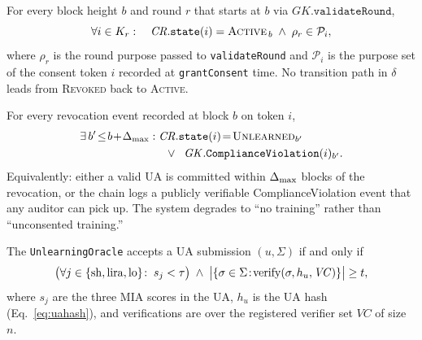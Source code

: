 \begin{property}\label{prop:safety}
For every block height $b$ and round $r$ that starts at $b$ via
$\mathit{GK}.\mathtt{validateRound}$,
\begin{equation}\label{eq:safety}
    \forall i \in K_r:\quad \mathit{CR}.\mathtt{state}(i) =
    \textsc{Active}_{\,b} \;\wedge\;
    \rho_r \in \mathcal{P}_i,
\end{equation}
where $\rho_r$ is the round purpose passed to
\texttt{validateRound} and $\mathcal{P}_i$ is the purpose set of the
consent token $i$ recorded at \texttt{grantConsent} time. No transition
path in $\delta$ leads from \textsc{Revoked} back to \textsc{Active}.
\end{property}

\begin{property}\label{prop:liveness}
For every revocation event recorded at block $b$ on token $i$,
\begin{equation}\label{eq:liveness}
\begin{aligned}
    \exists\, b' \!\le\! b\!+\!\Delta_{\max}:\;
    &\mathit{CR}.\mathtt{state}(i)\!=\!\textsc{Unlearned}_{b'} \\
    &\;\;\vee\;\;
    \mathit{GK}.\mathtt{ComplianceViolation}(i)_{b'}.
\end{aligned}
\end{equation}
Equivalently: either a valid UA is committed within $\Delta_{\max}$ blocks of
the revocation, or the chain logs a publicly verifiable
ComplianceViolation event that any auditor can pick up. The system
degrades to ``no training'' rather than ``unconsented training.''
\end{property}

\begin{property}\label{prop:verifiability}
The \texttt{UnlearningOracle} accepts a UA submission $(u, \Sigma)$
if and only if
\begin{equation}\label{eq:verifiability}
    \big(\forall j \in \{\mathrm{sh}, \mathrm{lira}, \mathrm{lo}\}\!:\;
        s_j < \tau\big) \;\wedge\;
    \big|\{\sigma \in \Sigma\!:\!\mathrm{verify}(\sigma, h_u, \mathit{VC})\}\big| \ge t,
\end{equation}
where $s_j$ are the three MIA scores in the UA, $h_u$ is the UA hash
(Eq.~\ref{eq:uahash}), and verifications are over the registered
verifier set $\mathit{VC}$ of size $n$.
\end{property}

